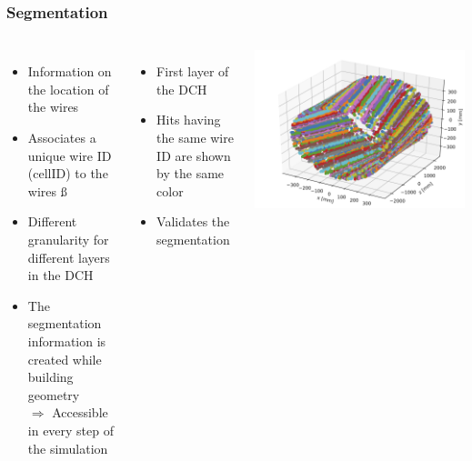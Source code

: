 \documentclass[hyperref={colorlinks=true,pdfpagelabels=false,linkcolor=black}, xcolor=dvipsnames,10pt]{beamer}
\begin{document}
\begin{frame}
	\frametitle{Segmentation}
		
	\begin{columns}[t]
		\begin{itemize}
		\item Information on the location of the wires \vspace{0.2cm}
		\item Associates a unique wire ID (cellID) to the wires \vspace{0.2cm}ß
		\item Different granularity for different layers in the DCH \vspace{0.2cm}
		\item The segmentation information is created while building geometry \vspace{0.2cm} \\
			$\Rightarrow$ Accessible in every step of the simulation
		\end{itemize}
	
		\begin{itemize}
		\item First layer of the DCH
		\item Hits having the same wire ID are shown by the same color
		\item Validates the segmentation
		\end{itemize}
		\centering
		\includegraphics[width=\textwidth]{../figures/allHits}
	\end{columns}
	
\end{frame}
\end{document}
